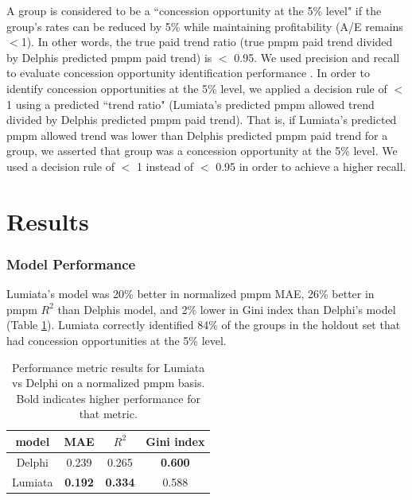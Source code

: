 \documentclass[letterpaper]{article} %
\begin{document}
A group is considered to be a ``concession opportunity at the 5\% level" if the group's rates can be reduced by 5\% while maintaining profitability (A/E remains $<$1). In other words, the true paid trend ratio (true pmpm paid trend divided by Delphis predicted pmpm paid trend) is $<$ 0.95.  We used precision and recall to evaluate concession opportunity identification performance \cite{PrecRecall}. In order to identify concession opportunities at the 5\% level, we applied a decision rule of $<$ 1 using a predicted ``trend ratio" (Lumiata's predicted pmpm allowed trend divided by Delphis predicted pmpm paid trend). That is, if Lumiata's predicted pmpm allowed trend was lower than Delphis predicted pmpm paid trend for a group, we asserted that group was a concession opportunity at the 5\% level. We used a decision rule of $<$ 1 instead of $<$ 0.95 in order to achieve a higher recall.






\section*{Results}
\subsubsection{Model Performance}\label{sec:performance}
Lumiata's model was 20\% better in normalized pmpm MAE, 26\% better in pmpm $R^2$ than Delphis model, and 2\% lower in Gini index than Delphi's model (Table \ref{tab:2}). Lumiata correctly identified 84\% of the groups in the holdout set that had concession opportunities at the 5\% level.


\begin{table} 
 \centering
 \begin{tabular}{c c c c} 
 \hline \hline
 model & MAE & $R^2$ & Gini index\\ 
 \hline
Delphi  & 0.239 & 0.265 & \textbf{0.600}\\ 
Lumiata & \textbf{0.192} & \textbf{0.334} & 0.588 \\
 \hline \hline
\end{tabular}
\caption{Performance metric results for Lumiata vs Delphi on a normalized pmpm basis.  Bold indicates higher performance for that metric.}
\label{tab:2}
\end{table}
\end{document}
